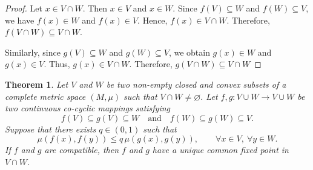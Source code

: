 \documentclass[11pt,a4paper,margin=1in]{amsart}
\theoremstyle{plain}
\newtheorem{theorem}{Theorem}[section]
\theoremstyle{definition}
\theoremstyle{remark}
\begin{document}
\begin{proof}
Let $x\in V\cap W$. Then $x\in V$ and $x\in W$. Since $f(V)\subseteq W$ and $f(W)\subseteq V$, 
we have $f(x)\in W$ and $f(x)\in V$. Hence, $f(x)\in V\cap W$. Therefore, $f(V\cap W)\subseteq V\cap W$. 

Similarly, since $g(V)\subseteq W$ and $g(W)\subseteq V$, we obtain $g(x)\in W$ and $g(x)\in V$. Thus, $g(x)\in V\cap W$. Therefore, $g(V\cap W)\subseteq V\cap W$
\end{proof}

\begin{theorem}\label{thm:co-cyclic-common-fixed-point}
Let $V$ and $W$ be two non-empty closed and convex subsets of a complete
metric space $(M,\mu)$ such that $V\cap W\neq\varnothing$. Let $f,g:V\cup W\to V\cup W$ be two continuous co-cyclic mappings satisfying
\[
f(V)\subseteq g(V)\subseteq W
\quad\text{and}\quad
f(W)\subseteq g(W)\subseteq V.
\]
Suppose that there exists $q\in(0,1)$ such that
\[
\mu(f(x),f(y))
\leq
q\,\mu(g(x),g(y)),
\qquad \forall x\in V,\ \forall y\in W.
\]
If $f$ and $g$ are compatible, then $f$ and $g$ have a unique common
fixed point in $V\cap W$.
\end{theorem}
\end{document}
